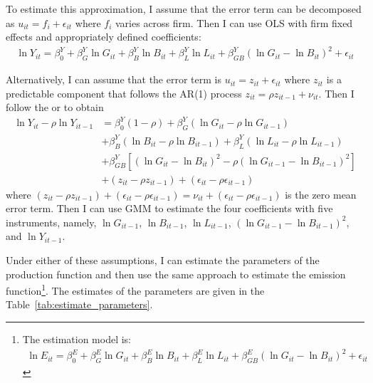 \documentclass[11pt]{article}
\begin{document}
To estimate this approximation, I assume that the error term can be decomposed as $u_{it} = f_i + \epsilon_{it}$ where $f_i$ varies across firm. Then I can use OLS with firm fixed effects and appropriately defined coefficients:
\begin{gather*}
    \ln Y_{it} = \beta_0^Y + \beta_G^Y \ln G_{it} + \beta_B^Y \ln B_{it} + \beta_L^Y \ln L_{it} + \beta_{GB}^Y (\ln G_{it} - \ln B_{it})^2 + \epsilon_{it}
\end{gather*}


Alternatively, I can assume that the error term is $u_{it} = z_{it} + \epsilon_{it}$ where $z_{it}$ is a predictable component that follows the AR(1) process $z_{it} = \rho z_{it-1} + \nu_{it}$. Then I follow the \cite{blundell2000gmm} or \cite{davis2014macroeconomic} to obtain
\begin{equation*}
  \begin{split}
    \ln Y_{it} - \rho \ln Y_{it-1} & = \beta_0^Y(1-\rho) + \beta_G^Y (\ln G_{it} - \rho \ln G_{it-1}) \\
    &  + \beta_B^Y (\ln B_{it} - \rho \ln B_{it-1}) + \beta_L^Y (\ln L_{it} - \rho \ln L_{it-1}) \\
    & + \beta_{GB}^Y [(\ln G_{it} -  \ln B_{it} )^2 - \rho(\ln G_{it-1} - \ln B_{it-1})^2]\\
    & + (z_{it} - \rho z_{it-1}) + (\epsilon_{it} - \rho \epsilon_{it-1})
  \end{split}
\end{equation*}
where $(z_{it} - \rho z_{it-1}) + (\epsilon_{it} - \rho \epsilon_{it-1}) = \nu_{it} + (\epsilon_{it} - \rho \epsilon_{it-1})$ is the zero mean error term. Then I can use GMM to estimate the four coefficients with five instruments, namely, $\ln G_{it-1}$, $\ln B_{it-1}$, $\ln L_{it-1}$, $(\ln G_{it-1} - \ln B_{it-1})^2$, and $\ln Y_{it-1}$.

Under either of these assumptions, I can estimate the parameters of the production function and then use the same approach to estimate the emission function\footnote{ The estimation model is:
\begin{gather*}
    \ln E_{it} = \beta_0^E + \beta_G^E \ln G_{it} + \beta_B^E \ln B_{it} + \beta_L^E \ln L_{it} + \beta_{GB}^E (\ln G_{it} - \ln B_{it})^2 + \epsilon_{it}
\end{gather*}}. The estimates of the parameters are given in the Table~\ref{tab:estimate_parameters}.
\end{document}
